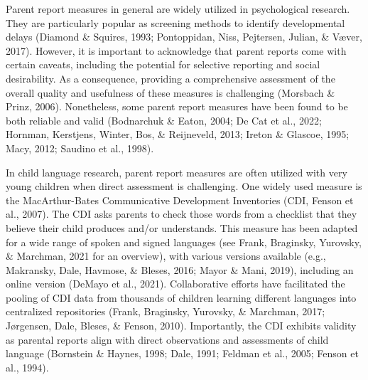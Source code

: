 \documentclass[
  man,floatsintext]{apa6}
\begin{document}
Parent report measures in general are widely utilized in psychological research. They are particularly popular as screening methods to identify developmental delays (Diamond \& Squires, 1993; Pontoppidan, Niss, Pejtersen, Julian, \& Væver, 2017). However, it is important to acknowledge that parent reports come with certain caveats, including the potential for selective reporting and social desirability. As a consequence, providing a comprehensive assessment of the overall quality and usefulness of these measures is challenging (Morsbach \& Prinz, 2006). Nonetheless, some parent report measures have been found to be both reliable and valid (Bodnarchuk \& Eaton, 2004; De Cat et al., 2022; Hornman, Kerstjens, Winter, Bos, \& Reijneveld, 2013; Ireton \& Glascoe, 1995; Macy, 2012; Saudino et al., 1998).

In child language research, parent report measures are often utilized with very young children when direct assessment is challenging. One widely used measure is the MacArthur-Bates Communicative Development Inventories (CDI, Fenson et al., 2007). The CDI asks parents to check those words from a checklist that they believe their child produces and/or understands. This measure has been adapted for a wide range of spoken and signed languages (see Frank, Braginsky, Yurovsky, \& Marchman, 2021 for an overview), with various versions available (e.g., Makransky, Dale, Havmose, \& Bleses, 2016; Mayor \& Mani, 2019), including an online version (DeMayo et al., 2021). Collaborative efforts have facilitated the pooling of CDI data from thousands of children learning different languages into centralized repositories (Frank, Braginsky, Yurovsky, \& Marchman, 2017; Jørgensen, Dale, Bleses, \& Fenson, 2010). Importantly, the CDI exhibits validity as parental reports align with direct observations and assessments of child language (Bornstein \& Haynes, 1998; Dale, 1991; Feldman et al., 2005; Fenson et al., 1994).
\end{document}
